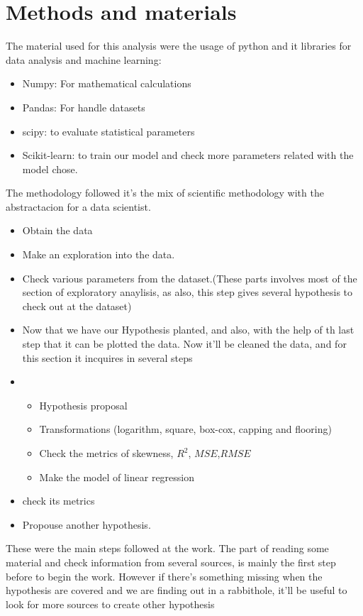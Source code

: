 \documentclass{article}
\begin{document}
\section{Methods and materials}
The material used for this analysis were the usage of python and it libraries for data analysis and machine learning:
\begin{itemize}
  \item Numpy: For mathematical calculations
  \item Pandas: For handle datasets 
  \item scipy: to evaluate statistical parameters
  \item Scikit-learn: to train our model and check more parameters related with the model chose.  
\end{itemize}
The methodology followed it's the mix of scientific methodology with the abstractacion for a data scientist. 
\begin{itemize}
  \item Obtain the data
  \item Make an exploration into the data.
  \item Check various parameters from the dataset.(These parts involves most of the section of exploratory anaylisis, as also, this step gives several hypothesis to check out at the dataset)
  \item Now that we have our Hypothesis planted, and also, with the help of th last step that it can be plotted the data. Now it'll be cleaned the data, and for this section it incquires in several steps
  \item \begin{itemize}
    \item Hypothesis proposal
    \item Transformations (logarithm, square, box-cox, capping and flooring)
    \item Check the metrics of skewness, $R^2$, $MSE$,$RMSE$ 
    \item Make the model of linear regression 
  \end{itemize}
  \item check its metrics
  \item Propouse another hypothesis.
\end{itemize}
These were the main steps followed at the work. The part of reading some material and check information from several sources, is mainly the first step before to begin the work. However if there's something missing when the hypothesis are covered and we are finding out in a rabbithole, it'll be useful to look for more sources to create other hypothesis
\end{document}

